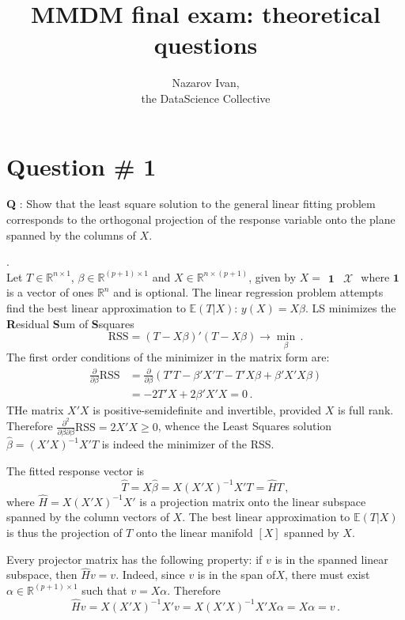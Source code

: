 \documentclass[a4paper]{article}
\title{MMDM final exam: theoretical questions}
\author{Nazarov Ivan, \rus{101мНОД(ИССА)}\\the DataScience Collective}
\newcommand{\Real}{\mathbb{R}}
\newcommand{\ex}{\mathbb{E}}
\newcommand{\one}{\mathbf{1}}
\newcommand{\RSS}{{\text{RSS}}}
\begin{document}
\maketitle
\tableofcontents
\clearpage

\section[OLS]{Question \# 1} %
\label{sec:question_1}
\textbf{\large \textbf{Q}} : Show that the least square solution to the general
linear fitting problem corresponds to the orthogonal projection of the response
variable onto the plane spanned by the columns of $X$.

 .\hfill\\ 
Let $T\in \Real^{n\times 1}$, $\beta\in \Real^{(p+1)\times 1}$ and
$X\in \Real^{n\times (p+1)}$, given by $X = \begin{smallmatrix} \one & \mathcal{X} \end{smallmatrix}$
where $\one$ is a vector of ones $\Real^n$ and is optional. The linear regression
problem attempts find the best linear approximation to $\ex(T|X)$: $y(X) = X\beta$.
LS minimizes the \textbf{R}esidual \textbf{S}um of \textbf{S}squares
\[ \RSS = (T-X\beta)'(T-X\beta) \to \min_\beta \,. \]
The first order conditions of the minimizer in the matrix form are:
\begin{align*}
	\frac{\partial}{\partial \beta}\RSS
	&= \frac{\partial}{\partial \beta} (T'T-\beta'X'T - T'X\beta + \beta'X'X\beta)\\
	&= - 2 T'X + 2 \beta'X'X = 0 \,.
\end{align*}
THe matrix $X'X$ is positive-semidefinite and invertible, provided $X$ is full rank.
Therefore $\frac{\partial^2}{\partial \beta\partial \beta}\RSS = 2 X'X \geq 0$,
whence the Least Squares solution $\hat{\beta} = (X'X)^{-1} X'T$ is indeed
the minimizer of the RSS.

The fitted response vector is 
\[ \hat{T} = X\hat{\beta} = X(X'X)^{-1}X' T = \hat{H} T\,, \]
where $\hat{H} = X(X'X)^{-1}X'$ is a projection matrix onto the linear subspace
spanned by the column vectors of $X$. The best linear approximation to $\ex(T\rvert X)$
is thus the projection of $T$ onto the linear manifold $[X]$ spanned by $X$.

Every projector matrix has the following property: if $v$ is in the spanned linear
subspace, then $\hat{H}v = v$. Indeed, since $v$ is in the span of$X$, there must
exist $\alpha \in \Real^{(p+1)\times 1}$ such that $v = X\alpha$. Therefore
\[ \hat{H} v = X(X'X)^{-1} X'v = X(X'X)^{-1} X'X\alpha = X\alpha = v\,. \]
\end{document}
